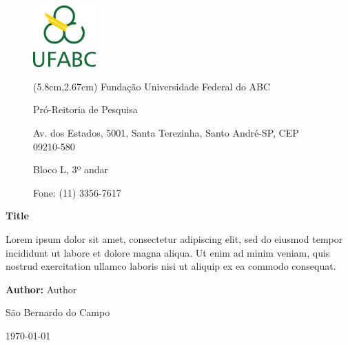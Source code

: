 \begin{figure}
    \includegraphics[width=2.4cm]{sections/figures/logo.png}
    \label{fig:ufabc}
    \textblockorigin{0mm}{0mm}
    \begin{textblock*}{15cm}(5.8cm,2.67cm)
        \small
        \singlespacing
        Fundação Universidade Federal do ABC
            
        Pró-Reitoria de Pesquisa
            
        Av. dos Estados, 5001, Santa Terezinha, Santo André-SP, CEP 09210-580
            
        Bloco L, 3º andar
        
        Fone: (11) 3356-7617
    \end{textblock*}
    \vspace{4cm}
\end{figure}
   
\begin{center}
    \huge \textbf{\textsf{Title}} \vspace{0.5cm}
\end{center}

\begin{changemargin}{10cm}{0cm}
    \vspace{3.5cm}
    \noindent Lorem ipsum dolor sit amet, consectetur adipiscing elit, sed do eiusmod tempor incididunt ut labore et dolore magna aliqua. Ut enim ad minim veniam, quis nostrud exercitation ullamco laboris nisi ut aliquip ex ea commodo consequat. 
    \vspace{5cm}
\end{changemargin}

\begin{onehalfspace}
\noindent
\textbf{Author:} Author \\
\end{onehalfspace}
\begin{center}
    \onehalfspacing
    São Bernardo do Campo

    \today
\end{center}

\date{\vspace{-2cm}} %
